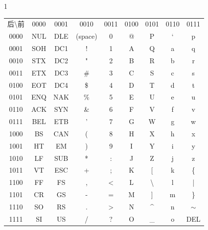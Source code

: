 \begin{frame}
\begin{spacing}{1}
\begin{table}[]
\begin{tabular}{ccccccccc}
        \rowcolor{maincolor!60}  后\textbackslash{}前   & 0000 & 0001 & 0010    & 0011           & 0100 & 0101               & 0110 & 0111   \\ 
        \cellcolor{maincolor!60}0000 & NUL  & DLE  & (space) & 0              & @    & P                  & `    & p      \\
        \cellcolor{maincolor!60}0001 & SOH  & DC1  & !       & 1              & A    & Q                  & a    & q      \\
        \cellcolor{maincolor!60}0010 & STX  & DC2  & "       & 2              & B    & R                  & b    & r      \\
        \cellcolor{maincolor!60}0011 & ETX  & DC3  & \#      & 3              & C    & S                  & c    & s      \\
        \cellcolor{maincolor!60}0100 & EOT  & DC4  & \$      & 4              & D    & T                  & d    & t      \\
        \cellcolor{maincolor!60}0101 & ENQ  & NAK  & \%      & 5              & E    & U                  & e    & u      \\
        \cellcolor{maincolor!60}0110 & ACK  & SYN  & \&      & 6              & F    & V                  & f    & v      \\
        \cellcolor{maincolor!60}0111 & BEL  & ETB  & '       & 7              & G    & W                  & g    & w      \\
        \cellcolor{maincolor!60}1000 & BS   & CAN  & (       & 8              & H    & X                  & h    & x      \\
        \cellcolor{maincolor!60}1001 & HT   & EM   & )       & 9              & I    & Y                  & i    & y      \\
        \cellcolor{maincolor!60}1010 & LF   & SUB  & *       & :              & J    & Z                  & j    & z      \\
        \cellcolor{maincolor!60}1011 & VT   & ESC  & +       & ;              & K    & {[}                & k    & \{     \\
        \cellcolor{maincolor!60}1100 & FF   & FS   & ,       & \textless{}    & L    & \textbackslash{}   & l    & |      \\
        \cellcolor{maincolor!60}1101 & CR   & GS   & -       & =              & M    & {]}                & m    & \}     \\
        \cellcolor{maincolor!60}1110 & SO   & RS   & .       & \textgreater{} & N    & \textasciicircum{} & n    & $\sim$ \\
        \cellcolor{maincolor!60}1111 & SI   & US   & /       & ?              & O    & \_                 & o    & DEL    \\ 
        \end{tabular}
        \end{table}
\end{spacing}
\end{frame}

